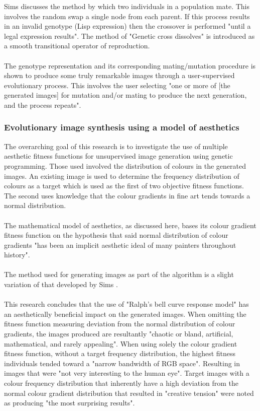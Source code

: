 \documentclass[10pt,a4paper]{article}
\begin{document}
Sims discusses the method by which two individuals in a population mate.
This involves the random swap a single node from each parent.
If this process results in an invalid genotype (Lisp expression) then the crossover is performed "until a legal expression results".
The method of "Genetic cross dissolves" is introduced as a smooth transitional operator of reproduction.
\\\\
The genotype representation and its corresponding mating/mutation procedure is shown to produce some truly remarkable images through a user-supervised evolutionary process.
This involves the user selecting "one or more of [the generated images] for mutation and/or mating to produce the next generation, and the process repeats".

\subsubsection{Evolutionary image synthesis using a model of aesthetics \cite{aesthetic measures}}

The overarching goal of this research is to investigate the use of multiple aesthetic fitness functions for unsupervised image generation using genetic programming.
Those used involved the distribution of colours in the generated images.
An existing image is used to determine the frequency distribution of colours as a target which is used as the first of two objective fitness functions.
The second uses knowledge that the colour gradients in fine art tends towards a normal distribution.
\\\\
The mathematical model of aesthetics, as discussed here, bases its colour gradient fitness function on the hypothesis that said normal distribution of colour gradients "has been an implicit aesthetic ideal of many painters throughout history".
\\\\
The method used for generating images as part of the algorithm is a slight variation of that developed by Sims \cite{sims}.
\\\\
This research concludes that the use of "Ralph's bell curve response model" has an aesthetically beneficial impact on the generated images.
When omitting the fitness function measuring deviation from the normal distribution of colour gradients, the images produced are resultantly "chaotic or bland, artificial, mathematical, and rarely appealing".
When using solely the colour gradient fitness function, without a target frequency distribution, the highest fitness individuals tended toward a "narrow bandwidth of RGB space".
Resulting in images that were "not very interesting to the human eye".
Target images with a colour frequency distribution that inherently have a high deviation from the normal colour gradient distribution that resulted in "creative tension" were noted as producing "the most surprising results".
\end{document}
